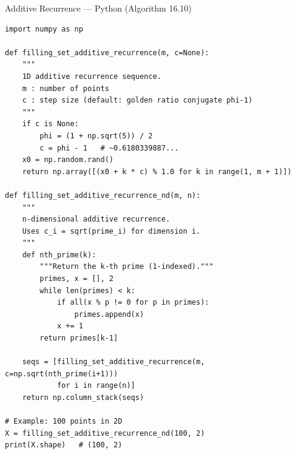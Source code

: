 \documentclass[aspectratio=169,10pt]{beamer}
\begin{document}
\begin{frame}[fragile]{Additive Recurrence --- Python (Algorithm 16.10)}
  \begin{lstlisting}[style=python, caption={Additive recurrence sequences}]
import numpy as np

def filling_set_additive_recurrence(m, c=None):
    """
    1D additive recurrence sequence.
    m : number of points
    c : step size (default: golden ratio conjugate phi-1)
    """
    if c is None:
        phi = (1 + np.sqrt(5)) / 2
        c = phi - 1   # ~0.6180339887...
    x0 = np.random.rand()
    return np.array([(x0 + k * c) % 1.0 for k in range(1, m + 1)])

def filling_set_additive_recurrence_nd(m, n):
    """
    n-dimensional additive recurrence.
    Uses c_i = sqrt(prime_i) for dimension i.
    """
    def nth_prime(k):
        """Return the k-th prime (1-indexed)."""
        primes, x = [], 2
        while len(primes) < k:
            if all(x % p != 0 for p in primes):
                primes.append(x)
            x += 1
        return primes[k-1]

    seqs = [filling_set_additive_recurrence(m, c=np.sqrt(nth_prime(i+1)))
            for i in range(n)]
    return np.column_stack(seqs)

# Example: 100 points in 2D
X = filling_set_additive_recurrence_nd(100, 2)
print(X.shape)   # (100, 2)
  \end{lstlisting}
\end{frame}
\end{document}
